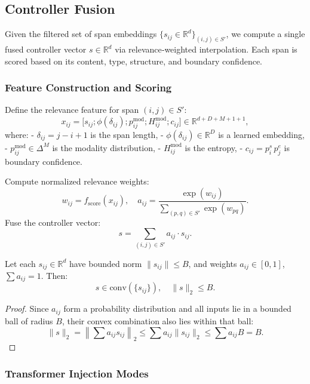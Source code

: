 \subsection{Controller Fusion}
\label{sec:controller-fusion}

Given the filtered set of span embeddings \(\{s_{ij}\in\mathbb{R}^d\}_{(i,j)\in S'}\), we compute a single fused controller vector \(s\in\mathbb{R}^d\) via relevance‐weighted interpolation. Each span is scored based on its content, type, structure, and boundary confidence.

\subsubsection{Feature Construction and Scoring}

Define the relevance feature for span \((i,j)\in S'\):
\[
x_{ij} = \bigl[
s_{ij};
\phi(\delta_{ij});
p^{\mathrm{mod}}_{ij};
H^{\mathrm{mod}}_{ij};
c_{ij}
\bigr] \in \mathbb{R}^{d + D + M + 1 + 1},
\]
where:
- \(\delta_{ij} = j - i + 1\) is the span length,
- \(\phi(\delta_{ij})\in\mathbb{R}^D\) is a learned embedding,
- \(p^{\mathrm{mod}}_{ij}\in\Delta^M\) is the modality distribution,
- \(H^{\mathrm{mod}}_{ij}\) is the entropy,
- \(c_{ij} = p^s_i\,p^e_j\) is boundary confidence.

Compute normalized relevance weights:
\[
w_{ij} = f_{\mathrm{score}}(x_{ij}),
\quad
a_{ij} = \frac{\exp(w_{ij})}{\sum_{(p,q)\in S'}\exp(w_{pq})}.
\]
Fuse the controller vector:
\[
s = \sum_{(i,j)\in S'} a_{ij} \cdot s_{ij}.
\]

\begin{proposition}
	Let each \(s_{ij}\in\mathbb{R}^d\) have bounded norm \(\|s_{ij}\|\le B\), and weights \(a_{ij}\in[0,1]\), \(\sum a_{ij}=1\). Then:
	\[
	s \in \mathrm{conv}(\{s_{ij}\}),
	\quad
	\|s\|_2 \le B.
	\]
\end{proposition}

\begin{proof}
	Since \(a_{ij}\) form a probability distribution and all inputs lie in a bounded ball of radius \(B\), their convex combination also lies within that ball:
	\[
	\|s\|_2 = \left\| \sum a_{ij} s_{ij} \right\|_2
	\le \sum a_{ij} \|s_{ij}\|_2 \le \sum a_{ij} B = B.
	\]
\end{proof}

\subsubsection{Transformer Injection Modes}

